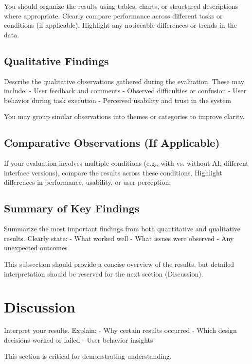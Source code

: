 \documentclass[sigconf]{acmart}
\begin{document}
You should organize the results using tables, charts, or structured descriptions where appropriate. Clearly compare performance across different tasks or conditions (if applicable). Highlight any noticeable differences or trends in the data.

\subsection{Qualitative Findings}

Describe the qualitative observations gathered during the evaluation. These may include:
- User feedback and comments
- Observed difficulties or confusion
- User behavior during task execution
- Perceived usability and trust in the system

You may group similar observations into themes or categories to improve clarity.

\subsection{Comparative Observations (If Applicable)}

If your evaluation involves multiple conditions (e.g., with vs. without AI, different interface versions), compare the results across these conditions. Highlight differences in performance, usability, or user perception.

\subsection{Summary of Key Findings}

Summarize the most important findings from both quantitative and qualitative results. Clearly state:
- What worked well
- What issues were observed
- Any unexpected outcomes

This subsection should provide a concise overview of the results, but detailed interpretation should be reserved for the next section (Discussion).
\section{Discussion}

Interpret your results. Explain:
- Why certain results occurred
- Which design decisions worked or failed
- User behavior insights

This section is critical for demonstrating understanding.

\end{document}

